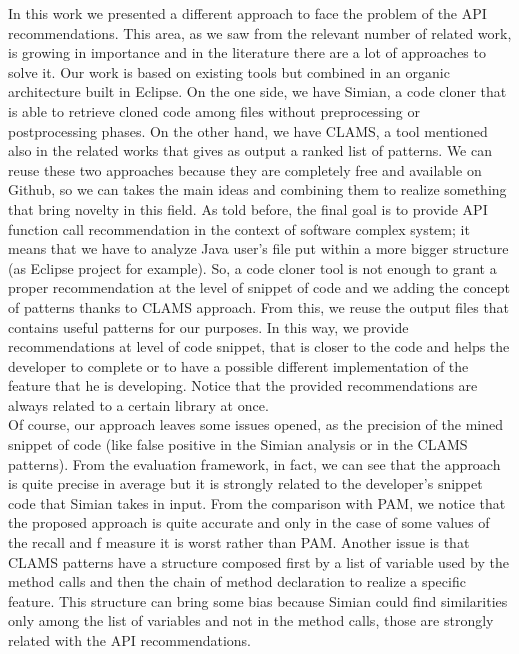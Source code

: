 In this work we presented a different approach to face the problem of the API recommendations. This area, as we saw from the relevant number of related work, is growing in importance and in the literature there are a lot of approaches to solve it. Our work is based on existing tools but combined in an organic architecture built in Eclipse. On the one side, we have Simian, a code cloner that is able to retrieve cloned code among files without preprocessing or postprocessing phases. On the other hand, we have CLAMS, a tool mentioned also in the related works that gives as output a ranked list of patterns. We can reuse these two approaches because they are completely free and available on Github, so we can takes the main ideas and combining them to realize something that bring novelty in this field. As told before, the final goal is to provide API function call recommendation in the context of software complex system; it means that we have to analyze Java user's file put within a more bigger structure (as Eclipse project for example). So, a code cloner tool is not enough to grant a proper recommendation at the level of snippet of code and we adding the concept of patterns thanks to CLAMS approach. From this, we reuse the output files that contains useful patterns for our purposes. In this way, we provide recommendations at level of code snippet, that is closer to the code and helps the developer to complete or to have a possible different implementation of the feature that he is developing. Notice that the provided recommendations are always related to a certain library at once. \\
Of course, our approach leaves some issues opened, as the precision of the mined snippet of code (like false positive in the Simian analysis or in the CLAMS patterns). From the evaluation framework, in fact, we can see that the approach is quite precise in average but it is strongly related to the developer's snippet code that Simian takes in input. From the comparison with PAM, we notice that the proposed approach is quite accurate and only in the case of some values of the recall and f measure it is worst rather than PAM. Another issue is that CLAMS patterns have a structure composed first by a list of variable used by the method calls and then the chain of method declaration to realize a specific feature. This structure can bring some bias because Simian could find similarities only among the list of variables and not in the method calls, those are strongly related with the API recommendations.\\ 
